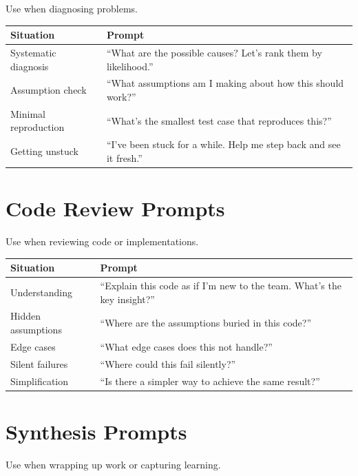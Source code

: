 Use when diagnosing problems.

\begin{table}[H]
\centering
\begin{tabular}{p{3cm}p{9cm}}
\toprule
\textbf{Situation} & \textbf{Prompt} \\
\midrule
Systematic diagnosis & ``What are the possible causes? Let's rank them by likelihood.'' \\
Assumption check & ``What assumptions am I making about how this should work?'' \\
Minimal reproduction & ``What's the smallest test case that reproduces this?'' \\
Getting unstuck & ``I've been stuck for a while. Help me step back and see it fresh.'' \\
\bottomrule
\end{tabular}
\end{table}

\section{Code Review Prompts}

Use when reviewing code or implementations.

\begin{table}[H]
\centering
\begin{tabular}{p{3cm}p{9cm}}
\toprule
\textbf{Situation} & \textbf{Prompt} \\
\midrule
Understanding & ``Explain this code as if I'm new to the team. What's the key insight?'' \\
Hidden assumptions & ``Where are the assumptions buried in this code?'' \\
Edge cases & ``What edge cases does this not handle?'' \\
Silent failures & ``Where could this fail silently?'' \\
Simplification & ``Is there a simpler way to achieve the same result?'' \\
\bottomrule
\end{tabular}
\end{table}

\section{Synthesis Prompts}

Use when wrapping up work or capturing learning.

